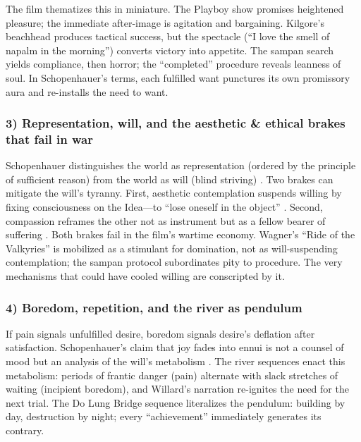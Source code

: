 The film thematizes this in miniature. The Playboy show promises heightened pleasure; the
immediate after-image is agitation and bargaining. Kilgore's beachhead produces tactical
success, but the spectacle (``I love the smell of napalm in the morning'') converts victory
into appetite. The sampan search yields compliance, then horror; the ``completed'' procedure
reveals leanness of soul. In Schopenhauer's terms, each fulfilled want punctures its own
promissory aura and re-installs the need to want.

\subsubsection*{3) Representation, will, and the aesthetic \& ethical brakes that fail in war}

Schopenhauer distinguishes the world as representation (ordered by the principle of sufficient
reason) from the world as will (blind striving) \parencite[pp.~3--5]{SchopenhauerWWR1969}.
Two brakes can mitigate the will's tyranny. First, aesthetic contemplation suspends willing by
fixing consciousness on the Idea—to ``lose oneself in the object''
\parencite[p.~178]{SchopenhauerWWR1969}. Second, compassion reframes the other not as instrument
but as a fellow bearer of suffering \parencite[pp.~372--374]{SchopenhauerWWR1969}.
Both brakes fail in the film's wartime economy. Wagner's ``Ride of the Valkyries'' is mobilized
as a stimulant for domination, not as will-suspending contemplation; the sampan protocol
subordinates pity to procedure. The very mechanisms that could have cooled willing are
conscripted by it.

\subsubsection*{4) Boredom, repetition, and the river as pendulum}

If pain signals unfulfilled desire, boredom signals desire's deflation after satisfaction.
Schopenhauer's claim that joy fades into ennui is not a counsel of mood but an analysis
of the will's metabolism \parencite[pp.~312--320]{SchopenhauerWWR1969}. The river sequences
enact this metabolism: periods of frantic danger (pain) alternate with slack stretches of
waiting (incipient boredom), and Willard's narration re-ignites the need for the next trial.
The Do Lung Bridge sequence literalizes the pendulum: building by day, destruction by night;
every ``achievement'' immediately generates its contrary.

